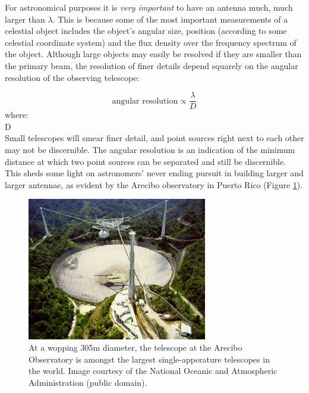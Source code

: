 \documentclass[a4paper,10pt]{report}
\begin{document}
For astronomical purposes it is \textit{very important} to have an antenna much, much larger than $\lambda$. This is because some 
of the most important measurements of a celestial object includes the object's angular size, position (according to some celestial 
coordinate system) and the flux density over the frequency spectrum of the object. Although large objects may easily be resolved if
they are smaller than the primary beam, the resolution of finer details depend squarely on the angular resolution of the observing 
telescope:

\begin{equation*}
 \text{angular resolution} \propto \frac{\lambda}{D}
\end{equation*}
where:\\
  D \\

Small telescopes will smear finer detail, and point sources right next to each other may not be discernible. The angular resolution is
an indication of the minimum distance at which two point sources can be separated and still be discernible. This sheds some light on astronomers'
never ending pursuit in building larger and larger antennae, as evident by the Arecibo observatory in Puerto Rico (Figure \ref{fig_arecibo}).

\begin{figure}[ht]
 \begin{mdframed}
 \centering
 \includegraphics[width=0.7\textwidth]{images/arecibo.jpg}
 \caption[Arecibo Observatory]{At a wopping 305m diameter, the telescope at the Arecibo Observatory is amongst the largest single-apperature telescopes in the world. 
 Image courtesy of the National Oceanic and Atmospheric Administration (public domain).}
  \label{fig_arecibo}
 \end{mdframed}
\end{figure}
\end{document}
